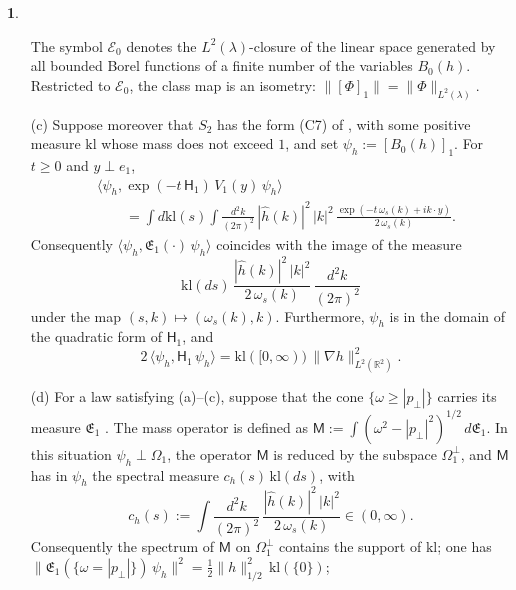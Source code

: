 \documentclass[11pt]{amsart}
\newcommand{\namedhead}{}
\theoremstyle{definition}
\newtheorem*{namedinner}{\namedhead}
\newenvironment{named}[1]{\renewcommand{\namedhead}{#1}\begin{namedinner}}{\end{namedinner}}
\begin{document}
\begin{named}{Proposition 4.2}
\begin{itemize}
The symbol $\mathcal E_0$ denotes the $L^2(\lambda)$-closure of the linear space generated by all bounded Borel functions of a finite number of the variables $B_0(h)$.
Restricted to $\mathcal E_0$, the class map is an isometry: $\|[\Phi]_1\|=\|\Phi\|_{L^2(\lambda)}$.
\item[(c)] Suppose moreover that $S_2$ has the form (C7) of \cite[Theorem~44]{QEDIII}, with some positive measure $\mathrm{kl}$ whose mass does not exceed $1$, and set $\psi_h:=[B_0(h)]_1$.
For $t\ge0$ and $y\perp e_1$,
\begin{equation}
\begin{split}
&\bigl\langle\psi_h,\exp(-t\,\mathsf H_1)\,V_1(y)\,\psi_h\bigr\rangle\\
&\qquad=\int d\mathrm{kl}(s)\int\frac{d^2k}{(2\pi)^2}\,|\hat h(k)|^2\,|k|^2\,\frac{\exp(-t\,\omega_s(k)+ik\cdot y)}{2\,\omega_s(k)}.
\end{split}
\tag{4.1}\label{eq:magnetic-semigroup}
\end{equation}
Consequently $\langle\psi_h,\mathfrak E_1(\cdot)\,\psi_h\rangle$ coincides with the image of the measure
\begin{equation*}
\mathrm{kl}(ds)\,\frac{|\hat h(k)|^2\,|k|^2}{2\,\omega_s(k)}\,\frac{d^2k}{(2\pi)^2}
\end{equation*}
under the map $(s,k)\mapsto(\omega_s(k),k)$.
Furthermore, $\psi_h$ is in the domain of the quadratic form of $\mathsf H_1$, and
\begin{equation}
2\,\langle\psi_h,\mathsf H_1\,\psi_h\rangle=\mathrm{kl}([0,\infty))\,\|\nabla h\|_{L^2(\mathbb R^2)}^2.
\tag{4.2}\label{eq:magnetic-energy}
\end{equation}
\item[(d)] For a law satisfying (a)--(c), suppose that the cone $\{\omega\ge|p_\perp|\}$ carries its measure $\mathfrak E_1$ \cite[Theorem~44\,(P1), (P4)--(P6), (C4), (C7); (D1), (D2)]{QEDIII}.
The mass operator is defined as $\mathsf M:=\int(\omega^2-|p_\perp|^2)^{1/2}\,d\mathfrak E_1$.
In this situation $\psi_h\perp\Omega_1$, the operator $\mathsf M$ is reduced by the subspace $\Omega_1^\perp$, and $\mathsf M$ has in $\psi_h$ the spectral measure $c_h(s)\,\mathrm{kl}(ds)$, with
\begin{equation*}
c_h(s):=\int\frac{d^2k}{(2\pi)^2}\,\frac{|\hat h(k)|^2\,|k|^2}{2\,\omega_s(k)}\in(0,\infty).
\end{equation*}
Consequently the spectrum of $\mathsf M$ on $\Omega_1^\perp$ contains the support of $\mathrm{kl}$;
one has $\|\mathfrak E_1(\{\omega=|p_\perp|\})\,\allowbreak \psi_h\|^2=\allowbreak \frac12\|h\|_{1/2}^2\,\allowbreak \mathrm{kl}(\{0\})$;
\end{itemize}
\end{named}
\end{document}
